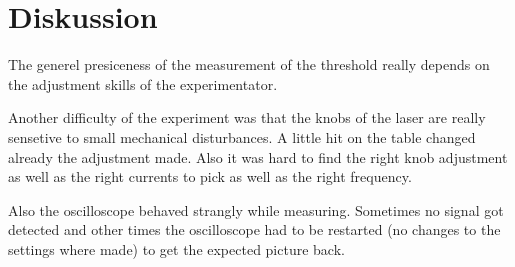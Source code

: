 \section{Diskussion}
\label{sec:Diskussion}
\noindent
The generel presiceness of the measurement of the threshold really depends on the adjustment skills of the 
experimentator. 

\noindent
Another difficulty of the experiment was that the knobs of the laser are really sensetive to small
mechanical disturbances. A little hit on the table changed already the adjustment made. 
Also it was hard to find the right knob adjustment as well as the right currents to pick as well as the right
frequency.

\noindent
Also the oscilloscope behaved strangly while measuring. Sometimes no signal got detected and other times 
the oscilloscope had to be restarted (no changes to the settings where made) to get the expected picture back.

